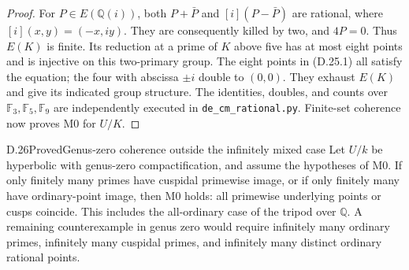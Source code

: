 \begin{proof}
For \(P\in E(\mathbb Q(i))\), both
\(P+\bar P\) and \([i](P-\bar P)\)
are rational, where
\([i](x,y)=(-x,iy)\). They are consequently
killed by two, and \(4P=0\). Thus
\(E(K)\) is finite. Its reduction at
a prime of \(K\) above five has at most
eight points and is injective on this
two-primary group. The eight points
in (D.25.1) all satisfy the equation;
the four with abscissa \(\pm i\) double
to \((0,0)\). They exhaust \(E(K)\)
and give its indicated group structure.
The identities, doubles, and counts over
\(\mathbb F_3,\mathbb F_5,\mathbb F_9\)
are independently executed in
\texttt{de\_cm\_rational.py}. Finite-set
coherence now proves M0 for \(U/K\).
\end{proof}

\begin{statement}{D.26}{Proved}{Genus-zero coherence outside the infinitely mixed case}
Let \(U/k\) be hyperbolic with genus-zero
compactification, and assume the hypotheses
of M0. If only finitely many primes have
cuspidal primewise image, or if only
finitely many have ordinary-point image,
then M0 holds: all primewise underlying
points or cusps coincide. This includes
the all-ordinary case of the tripod over
\(\mathbb Q\). A remaining counterexample
in genus zero would require infinitely
many ordinary primes, infinitely many
cuspidal primes, and infinitely many
distinct ordinary rational points.
\end{statement}
